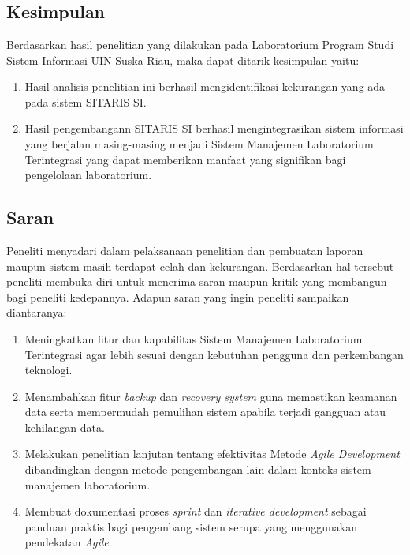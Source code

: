 %
%
%
%


\chapter{\babEnam}
\section{Kesimpulan}
Berdasarkan hasil penelitian yang dilakukan pada Laboratorium Program Studi Sistem Informasi UIN Suska Riau, maka dapat ditarik kesimpulan yaitu:

\begin{enumerate}
	\item Hasil analisis penelitian ini berhasil mengidentifikasi kekurangan yang ada pada sistem SITARIS SI.
	\item Hasil pengembangann SITARIS SI berhasil mengintegrasikan sistem informasi yang berjalan masing-masing menjadi Sistem Manajemen Laboratorium Terintegrasi yang dapat memberikan manfaat yang signifikan bagi pengelolaan laboratorium.
\end{enumerate}

\section{Saran}
Peneliti menyadari dalam pelaksanaan penelitian dan pembuatan laporan maupun sistem masih terdapat celah dan kekurangan. Berdasarkan hal tersebut peneliti membuka diri untuk menerima saran maupun kritik yang membangun bagi peneliti kedepannya. Adapun saran yang ingin peneliti sampaikan diantaranya:

\begin{enumerate}
	\item Meningkatkan fitur dan kapabilitas Sistem Manajemen Laboratorium Terintegrasi agar lebih sesuai dengan kebutuhan pengguna dan perkembangan teknologi.
	\item Menambahkan fitur \textit{backup} dan \textit{recovery system} guna memastikan keamanan data serta mempermudah pemulihan sistem apabila terjadi gangguan atau kehilangan data.
	\item Melakukan penelitian lanjutan tentang efektivitas Metode \textit{Agile Development} dibandingkan dengan metode pengembangan lain dalam konteks sistem manajemen laboratorium.
	\item Membuat dokumentasi proses \textit{sprint} dan \textit{iterative development} sebagai panduan praktis bagi pengembang sistem serupa yang menggunakan pendekatan \textit{Agile}.
\end{enumerate}